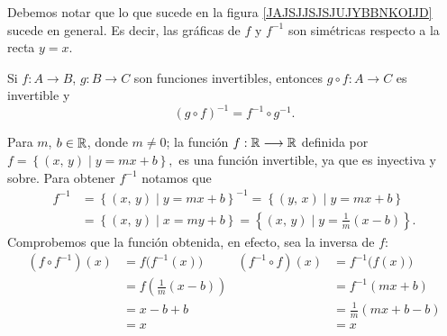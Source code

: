 \newpage

\begin{obs}{}{}
    Debemos notar que lo que sucede en la figura \ref{JAJSJJSJSJUJYBBNKOIJD} sucede en general. Es decir, las gráficas de $f$ y $f^{-1}$ son simétricas respecto a la recta $y = x$.
    \begin{center}
    \end{center}
\end{obs}

\begin{theorem}{}{}
    Si $f:A \longrightarrow B$, $g: B \longrightarrow C$ son funciones invertibles, entonces $g \circ f:A \longrightarrow C$ es invertible y
    $$(g \circ f)^{-1} = f^{-1} \circ g^{-1}.$$
\end{theorem}

\begin{myexample}
    Para $m$, $b \in \RR$, donde $m \neq 0$; la función $f: \RR \longrightarrow \RR$ definida por
    $f = \left\{ (x, \, y) \mid y = mx + b \right\},$
    es una función invertible, ya que es inyectiva y sobre. Para obtener $f^{-1}$ notamos que
    \begin{align*}
        f^{-1} & = \left\{ (x, \, y) \mid y = mx + b \right\}^{-1} = \left\{ (y, \, x) \mid y = mx + b \right\} \\
        & = \left\{ (x, \, y) \mid x = my + b \right\} = \left\{ (x, \, y) \mid y = \frac{1}{m} (x-b) \right\}.
    \end{align*}
    Comprobemos que la función obtenida, en efecto, sea la inversa de $f$:
    \begin{align*}
        (f \circ f^{-1})(x) & = f\big( f^{-1}(x)\big) & (f^{-1} \circ f)(x) & = f^{-1}\big( f(x)\big) \\
        & = f\left( \frac{1}{m} (x-b) \right) & & = f^{-1}(mx+b) \\
        & = x - b + b & & = \frac{1}{m} (mx +b - b) \\
        & = x & & = x
    \end{align*}
\end{myexample}

